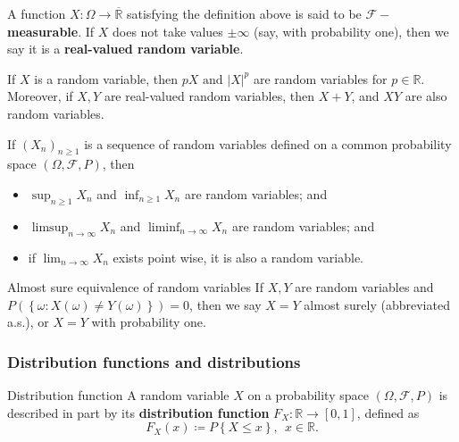 A function \( X : \Omega \to \overline{\mathbb{R} } \) satisfying the definition above is said to be \( \mathcal{F}-\)\textbf{measurable}. If \( X \) does not take values \( \pm \infty  \) (say, with probability one), then we say it is a \textbf{real-valued random variable}. 

\begin{idea}{}{}
If \( X \) is a random variable, then \( pX \text{ and }  \left\lvert X \right\rvert ^p \) are random variables for \( p \in \mathbb{R}  \). Moreover, if \( X,Y \) are real-valued random variables, then \( X + Y \), and \( XY \) are also random variables. 

\end{idea}


\begin{idea}{}{}
    If \( (X_{n} )_{n \geq 1}  \) is a sequence of random variables defined on a common probability space \( (\Omega , \mathcal{F} , P) \), then 
    \begin{itemize}
        \item \( \sup _ {n\geq 1} X_{n} \) and \( \inf _{n\geq 1}X_{n}  \)  are random variables; and
        \item \( \limsup_{n \to \infty} X_{n}  \) and \( \liminf_{n \to \infty} X_{n}  \) are random variables; and 
        \item if \( \lim_{n \to \infty} X_{n}  \) exists point wise, it is also a random variable. 
    \end{itemize}
\end{idea}

\begin{defn}{Almost sure equivalence of random variables}{}
If \( X, Y \) are random variables and \( P(\left\{ \omega :X(\omega )\neq Y(\omega )  \right\} )= 0 \), then we say \( X = Y \) almost surely (abbreviated a.s.), or \( X = Y \) with probability one. 

\end{defn}

\subsubsection{Distribution functions and distributions}

\begin{defn}{Distribution function}{}
    A random variable \( X \) on a probability space \( (\Omega , \mathcal{F} , P) \) is described in part by its \textbf{distribution function} \( F_{X} : \mathbb{R} \to [0,1] \), defined as 
    \[
        F_{X} (x)\coloneqq P\left\{ X\leq x \right\}, \ \ x\in \mathbb{R} .
    \]


\end{defn}

